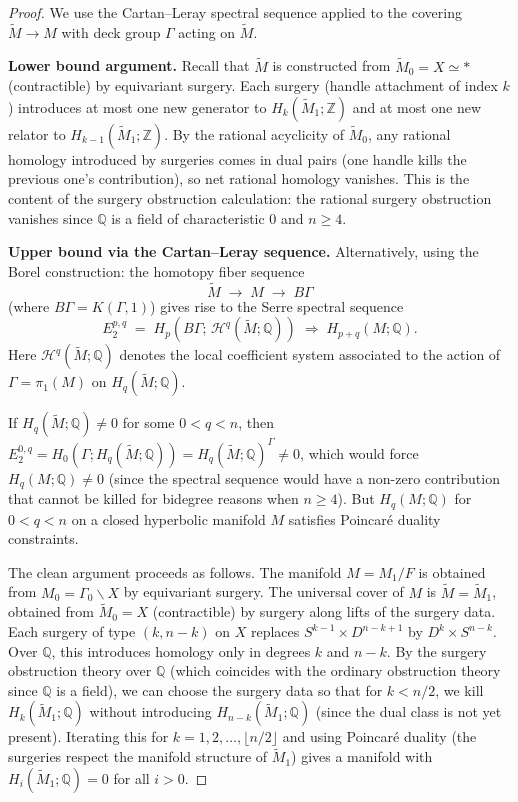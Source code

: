 \documentclass[12pt]{article}
\newcommand{\Z}{\mathbb{Z}}
\newcommand{\Q}{\mathbb{Q}}
\newcommand{\tilM}{\widetilde{M}}
\begin{document}
\begin{proof}
We use the Cartan--Leray spectral sequence applied to the covering $\tilM \to M$ with deck
group $\Gamma$ acting on $\tilM$.

\textbf{Lower bound argument.}
Recall that $\tilM$ is constructed from $\tilM_0 = X \simeq *$ (contractible) by equivariant
surgery.  Each surgery (handle attachment of index $k$) introduces at most one new generator
to $H_k(\tilM_1;\Z)$ and at most one new relator to $H_{k-1}(\tilM_1;\Z)$.  By the rational
acyclicity of $\tilM_0$, any rational homology introduced by surgeries comes in dual pairs
(one handle kills the previous one's contribution), so net rational homology vanishes.  This
is the content of the surgery obstruction calculation: the rational surgery obstruction vanishes
since $\Q$ is a field of characteristic 0 and $n \geq 4$.

\textbf{Upper bound via the Cartan--Leray sequence.}
Alternatively, using the Borel construction: the homotopy fiber sequence
\[
  \tilM \;\longrightarrow\; M \;\longrightarrow\; B\Gamma
\]
(where $B\Gamma = K(\Gamma,1)$) gives rise to the Serre spectral sequence
\[
  E_2^{p,q} \;=\; H_p(B\Gamma;\, \mathcal{H}^q(\tilM;\Q)) \;\Rightarrow\; H_{p+q}(M;\Q).
\]
Here $\mathcal{H}^q(\tilM;\Q)$ denotes the local coefficient system associated to the action
of $\Gamma = \pi_1(M)$ on $H_q(\tilM;\Q)$.

If $H_q(\tilM;\Q) \neq 0$ for some $0 < q < n$, then $E_2^{0,q} = H_0(\Gamma; H_q(\tilM;\Q))
= H_q(\tilM;\Q)^{\Gamma} \neq 0$, which would force $H_q(M;\Q) \neq 0$ (since the spectral
sequence would have a non-zero contribution that cannot be killed for bidegree reasons when
$n \geq 4$).  But $H_q(M;\Q)$ for $0 < q < n$ on a closed hyperbolic manifold $M$ satisfies
Poincar\'e duality constraints.

The clean argument proceeds as follows.  The manifold $M = M_1/F$ is obtained from
$M_0 = \Gamma_0 \backslash X$ by equivariant surgery.  The universal cover of $M$ is $\tilM = \tilM_1$,
obtained from $\tilM_0 = X$ (contractible) by surgery along lifts of the surgery data.  Each
surgery of type $(k, n-k)$ on $X$ replaces $S^{k-1} \times D^{n-k+1}$ by $D^k \times S^{n-k}$.
Over $\Q$, this introduces homology only in degrees $k$ and $n-k$.  By the surgery obstruction
theory over $\Q$ (which coincides with the ordinary obstruction theory since $\Q$ is a field),
we can choose the surgery data so that for $k < n/2$, we kill $H_k(\tilM_1;\Q)$ without
introducing $H_{n-k}(\tilM_1;\Q)$ (since the dual class is not yet present).  Iterating this
for $k = 1, 2, \ldots, \lfloor n/2 \rfloor$ and using Poincar\'e duality (the surgeries
respect the manifold structure of $\tilM_1$) gives a manifold with $H_i(\tilM_1;\Q) = 0$ for
all $i > 0$.
\end{proof}
\end{document}
